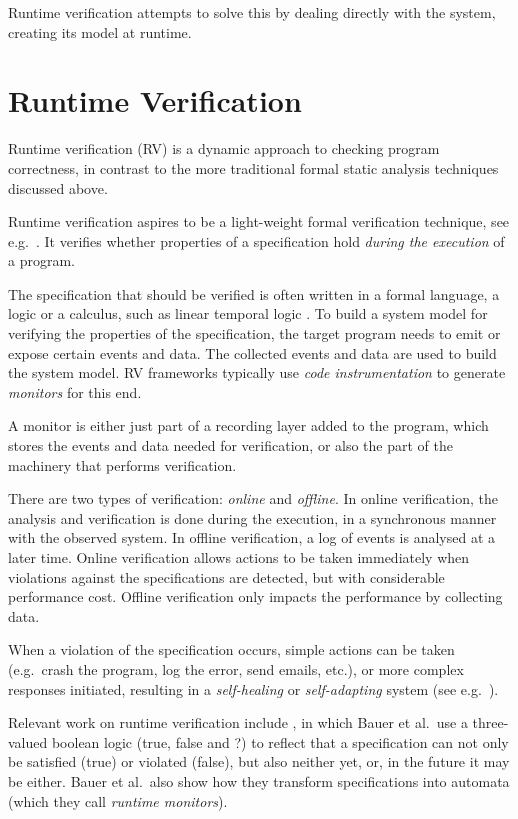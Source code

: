 \documentclass[a4paper,11pt]{kth-mag}
\begin{document}
Runtime verification attempts to solve this by dealing directly with the
system, creating its model at runtime.


\section{Runtime Verification} \label{section-rv}

Runtime verification (RV) is a dynamic approach to checking program
correctness, in contrast to the more traditional formal static analysis
techniques discussed above.

Runtime verification aspires to be a light-weight formal verification
technique, see e.g.\ \cite{leucker09abriefaccount,delgado04taxonomy}. It
verifies whether properties of a specification hold \textit{during the
execution} of a program.

The specification that should be verified is often written in a formal
language, a logic or a calculus, such as linear temporal logic \cite{pnueli77}.
To build a system model for verifying the properties of the specification, the
target program needs to emit or expose certain events and data. The collected
events and data are used to build the system model. RV frameworks typically
use \textit{code instrumentation} to generate \textit{monitors} for this end.

A monitor is either just part of a recording layer added to the program, which
stores the events and data needed for verification, or also the part of the
machinery that performs verification.

There are two types of verification: \emph{online} and \emph{offline}. In
online verification, the analysis and verification is done during the
execution, in a synchronous manner with the observed system. In offline
verification, a log of events is analysed at a later time. Online verification
allows actions to be taken immediately when violations against the
specifications are detected, but with considerable performance cost. Offline
verification only impacts the performance by collecting data.

When a violation of the specification occurs, simple actions can be taken
(e.g.\ crash the program, log the error, send emails, etc.), or more complex
responses initiated, resulting in a \textit{self-healing} or
\textit{self-adapting} system (see e.g.\ \cite{huebscher08survey}).

Relevant work on runtime verification include \cite{bauer06monitoring}, in
which Bauer et al.\ use a three-valued boolean logic (true, false and ?) to
reflect that a specification can not only be satisfied (true) or violated
(false), but also neither yet, or, in the future it may be either. Bauer et
al.\ also show how they transform specifications into automata (which they call
\textit{runtime monitors}).
\end{document}
